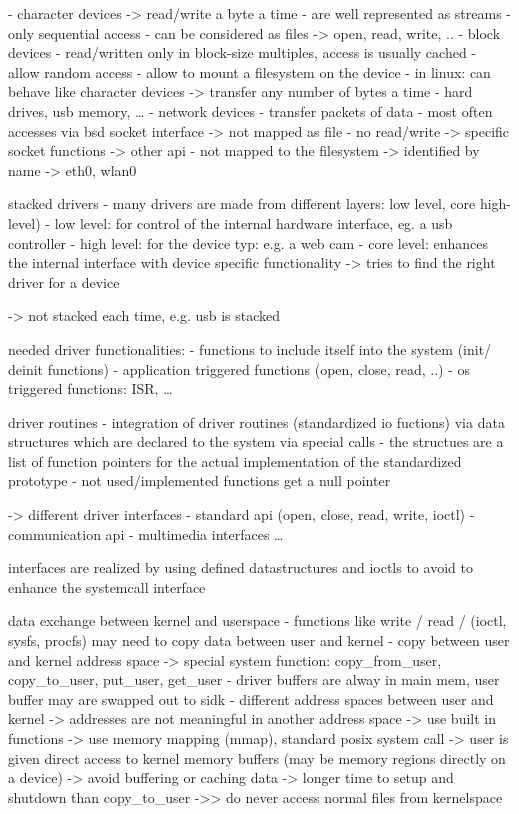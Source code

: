 \cite{lfd430}
- character devices -> read/write a byte a time
    - are well represented as streams
    - only sequential access
    - can be considered as files -> open, read, write, ..
- block devices
    - read/written only in block-size multiples, access is usually cached
    - allow random access
    - allow to mount a filesystem on the device
    - in linux: can behave like character devices -> transfer any number of bytes a time
    - hard drives, usb memory, \ldots
- network devices
    - transfer packets of data
    - most often accesses via bsd socket interface -> not mapped as file
    - no read/write -> specific socket functions -> other api
    - not mapped to the filesystem -> identified by name -> eth0, wlan0


\cite{quade2016Linux}
stacked drivers
- many drivers are made from different layers: low level, core high-level)
- low level: for control of the internal hardware interface, eg. a usb controller
- high level: for the device typ: e.g. a web cam
- core level: enhances the internal interface with device specific functionality -> tries to find the right driver for a device

\cite{lfd430}
-> not stacked each time, e.g. usb is stacked


\cite{quade2016Linux}
needed driver functionalities: 
- functions to include itself into the system (init/ deinit functions)
- application triggered functions (open, close, read, ..)
- os triggered functions: ISR, \ldots


driver routines
- integration of driver routines  (standardized io fuctions) via data structures which are declared to the system via special calls
- the structues are a list of function pointers for the actual implementation of the standardized prototype
- not used/implemented functions get a null pointer

\cite{quade2016Linux}
-> different driver interfaces
    - standard api (open, close, read, write, ioctl)
    - communication api
    - multimedia interfaces \ldots

    interfaces are realized by using defined datastructures and ioctls to avoid to enhance the systemcall interface

data exchange between kernel and userspace
- functions like write / read / (ioctl, sysfs, procfs) may need to copy data between user and kernel
- copy between user and kernel address space -> special system function: copy_from_user, copy_to_user, put_user, get_user
- driver buffers are alway in main mem, user buffer may are swapped out to sidk
\cite{lfd430}
- different address spaces between user and kernel -> addresses are not meaningful in another address space
-> use built in functions
-> use memory mapping (mmap), standard posix system call -> user is given direct access to kernel memory buffers (may be memory regions directly on a device) -> avoid buffering or caching data -> longer time to setup and shutdown than copy_to_user
->> do never access normal files from kernelspace

